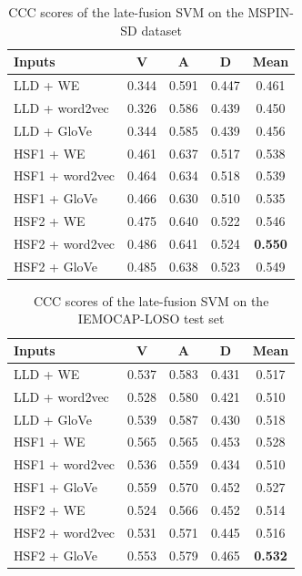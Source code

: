 \begin{table}
\caption{CCC scores of the late-fusion SVM on the MSPIN-SD dataset}    
\begin{center}
 \label{tab:svm-mspin-sd}
 \begin{tabular}{l c c c c}
 \hline
Inputs & V & A & D & Mean \\
\hline \hline
LLD     + WE        & 0.344 & 0.591 & 0.447 & 0.461 \\
LLD     + word2vec  & 0.326 & 0.586 & 0.439 & 0.450 \\
LLD     + GloVe     & 0.344 & 0.585 & 0.439 & 0.456 \\
HSF1    + WE        & 0.461 & 0.637 & 0.517 & 0.538 \\
HSF1    + word2vec  & 0.464 & 0.634 & 0.518 & 0.539 \\
HSF1    + GloVe     & 0.466 & 0.630 & 0.510 & 0.535 \\
HSF2    + WE        & 0.475 & 0.640 & 0.522 & 0.546 \\
HSF2    + word2vec  & 0.486 & 0.641 & 0.524 & \textbf{0.550} \\
HSF2    + GloVe     & 0.485 & 0.638 & 0.523 & 0.549 \\
 \hline
 \end{tabular}
\end{center}
\end{table} 

\begin{table}[!htpb]
\caption{CCC scores of the late-fusion SVM on the IEMOCAP-LOSO test set}
\begin{center}
 \label{tab:svm-iemocap-loso}
 \begin{tabular}{l c c c c}
 \hline 
Inputs & V & A & D & Mean \\
\hline \hline
LLD     + WE        & 0.537 & 0.583 & 0.431 & 0.517 \\
LLD     + word2vec  & 0.528 & 0.580 & 0.421 & 0.510 \\
LLD     + GloVe     & 0.539 & 0.587 & 0.430 & 0.518 \\
HSF1    + WE        & 0.565 & 0.565 & 0.453 & 0.528 \\
HSF1    + word2vec  & 0.536 & 0.559 & 0.434 & 0.510 \\
HSF1    + GloVe     & 0.559 & 0.570 & 0.452 & 0.527 \\
HSF2    + WE        & 0.524 & 0.566 & 0.452 & 0.514 \\
HSF2    + word2vec  & 0.531 & 0.571 & 0.445 & 0.516 \\
HSF2    + GloVe     & 0.553 & 0.579 & 0.465 & \textbf{0.532} \\
 \hline
\end{tabular}
\end{center}
\end{table} 


